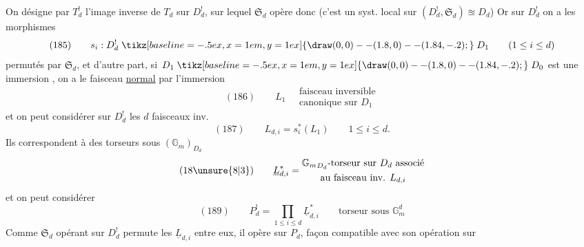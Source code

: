 On désigne par $T^!_d$ l'image inverse de $T_d$ sur $D^!_d$, sur lequel $\mathfrak S_d$ opère donc (c'est un  syst. local sur $(D^!_d,\mathfrak S_d)\approxeq D_d$) Or sur $D^!_d$ on a les  morphismes
\[
(185)\qquad s_i:D^!_d\mathrel{\tikz[baseline=-.5ex,x=1em,y=1ex]{\draw (0,0)--(1.8,0)--(1.84,-.2);}}D_1\qquad(1\leq i\leq d)
\]
permutés par $\mathfrak S_d$, et d'autre part, si $D_1\mathrel{\tikz[baseline=-.5ex,x=1em,y=1ex]{\draw (0,0)--(1.8,0)--(1.84,-.2);}}D_0$ est une immersion  , on a  le faisceau \uline{normal} par l'immersion
\[
(186)\qquad L_1\quad\begin{gathered}\text{faisceau inversible}\\\text{canonique sur }D_1\end{gathered}
\]
et on peut considérer sur $D^!_d$ les $d$ faisceaux inv.
\[
(187)\qquad L_{d,i}=s_i^*(L_1)\qquad1\leq i\leq d.
\]
Ils correspondent à des torseurs sous $(\mathbb G_m)_{D_d}$
\[
(18\unsure{8|3})\qquad\underline L_{d,i}^*=\begin{gathered}{\mathbb G_m}_{D_d}\text{-torseur sur }D_d\text{ associé}\\\text{au faisceau inv. }L_{d,i}\end{gathered}
\]
et on peut considérer
\[
(189)\qquad P^!_d=\prod_{1\leq i\leq d}\underline L_{d,i}^*\qquad\text{torseur sous }\mathbb G_m^d
\]
Comme $\mathfrak S_d$ opérant sur $D^!_d$ permute les  $\underline L_{d,i}$ entre eux, il opère sur $P_d$,    façon compatible avec son opération sur

